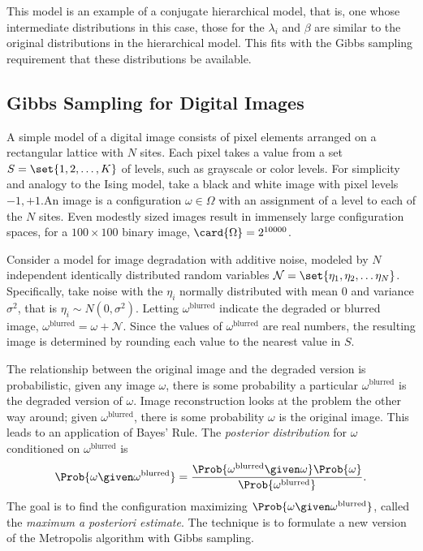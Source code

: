 \documentclass[12pt]{article}
\begin{document}
This model is an example of a conjugate hierarchical model,%
that is, one whose intermediate distributions in this case, those for
the \( \lambda_i \) and \( \beta \) are similar to the original
distributions in the hierarchical model.  This fits with the Gibbs
sampling requirement that these distributions be available.

\subsection*{Gibbs Sampling for Digital Images}

A simple model of a digital image consists of pixel elements arranged
on a rectangular lattice with \( N \) sites.  Each pixel takes a value
from a set \( S = \set{1,2, \dots, K} \) of levels, such as grayscale
or color levels.  For simplicity and analogy to the Ising model, take
a black and white image with pixel levels \( -1, +1 \).An image is a
configuration \( \omega \in \Omega \) with an assignment of a level to
each of the \( N \) sites.  Even modestly sized images result in
immensely large configuration spaces, for a \( 100 \times 100 \)
binary image, \( \card{\Omega} = 2^{10000} \).

Consider a model for image degradation with additive noise, modeled by \(
N \) independent identically distributed random variables \(
\mathcal{N} = \set{\eta_1, \eta_2, \dots \eta_N} \).  Specifically, take
noise with the \( \eta_i \) normally distributed with mean \( 0 \) and
variance \( \sigma^2 \), that is \( \eta_i \sim N(0, \sigma^2) \).
Letting \( \omega^{\text{blurred}} \) indicate the degraded or blurred
image, \( \omega^{\text{blurred}} = \omega + \mathcal{N} \).  Since the
values of \( \omega^{\text{blurred}} \) are real numbers, the resulting
image is determined by rounding each value to the nearest value in \( S \).

The relationship between the original image and the degraded version is
probabilistic, given any image \( \omega \), there is some probability a
particular \( \omega^{\text{blurred}} \) is the degraded version of \(
\omega \).  Image reconstruction looks at the problem the other way
around; given \( \omega^{\text{blurred}} \), there is some probability \(
\omega \) is the original image.  This leads to an application of Bayes'
Rule.  The \emph{posterior distribution}%
for \( \omega \) conditioned on \( \omega^{\text{blurred}} \) is
\[
    \Prob{\omega \given \omega^{\text{blurred}}} = \frac{\Prob{\omega^{\text
    {blurred}} \given \omega} \Prob{\omega}} {\Prob{\omega^{\text{blurred}}}}.
\] The goal is to find the configuration maximizing \( \Prob{\omega
\given \omega^{\text{blurred}}} \), called the \emph{maximum a
posteriori estimate}.%
The technique is to formulate a new version of the Metropolis algorithm
with Gibbs sampling.
\end{document}
